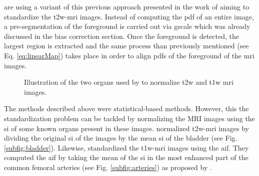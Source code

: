 \begin{enumerate}[leftmargin=*]
\cite{Viswanath2009,Viswanath2011,Viswanath2012} are using a variant of this previous approach presented in the work of \cite{Madabhushi2006a} aiming to standardize the \ac{t2w}-\ac{mri} images. Instead of computing the \ac{pdf} of an entire image, a pre-segmentation of the foreground is carried out via \ac{gscale} which was already discussed in the bias correction section. Once the foreground is detected, the largest region is extracted and the same process than previously mentioned (see Eq. \ref{eq:linearMap}) takes place in order to align \acp{pdf} of the foreground of the \ac{mri} images.

\begin{figure}
\centering
	\hspace*{\fill}
	 \hfill
	\hspace*{\fill}
	\caption{Illustration of the two organs used by \cite{Niaf2011,Niaf2012} to normalize \ac{t2w} and \ac{t1w} \ac{mri} images.}
	\label{fig:niaf}
\end{figure}

The methods described above were statistical-based methods. However, this the standardization problem can be tackled by normalizing the MRI images using the \ac{si} of some known organs present in these images. \cite{Niaf2011,Niaf2012} normalized \ac{t2w}-\ac{mri} images by dividing the original \ac{si} of the images by the mean \ac{si} of the bladder (see Fig. \ref{subfig:bladder}). Likewise, \cite{Niaf2011} standardized the \ac{t1w}-\ac{mri} images using the \ac{aif}. They computed the \ac{aif} by taking the mean of the \ac{si} in the most enhanced part of the common femoral arteries (see Fig. \ref{subfig:arteries}) as proposed by \cite{Wiart2007}.

\end{enumerate}

